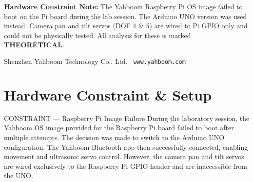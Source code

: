 \documentclass[12pt,a4paper]{article}
\begin{document}
\begin{titlepage}
  \vfill

  \begin{tcolorbox}[
    colback=DangerBG,colframe=DangerRed,
    boxrule=0.8pt,arc=4pt,
    left=10pt,right=10pt,top=6pt,bottom=6pt,
    width=0.85\linewidth
  ]
  \centering\small
  \textbf{Hardware Constraint Note:} The Yahboom Raspberry Pi OS image failed to boot on the
  Pi board during the lab session. The Arduino UNO version was used instead.
  Camera pan and tilt servos (DOF 4 \& 5) are wired to Pi GPIO only and could
  not be physically tested. All analysis for these is marked \textbf{THEORETICAL}.
  \end{tcolorbox}

  \vspace{0.5cm}
  {\small\color{MedGray} Shenzhen Yahboom Technology Co., Ltd. \textbar\
   \texttt{www.yahboom.com}}
\end{titlepage}

\tableofcontents
\newpage

\section{Hardware Constraint \& Setup}

\begin{dangerbox}{CONSTRAINT --- Raspberry Pi Image Failure}
During the laboratory session, the Yahboom OS image provided for the Raspberry Pi
board failed to boot after multiple attempts. The decision was made to switch to
the Arduino UNO configuration. The Yahboom Bluetooth app then successfully
connected, enabling movement and ultrasonic servo control. However, the camera
pan and tilt servos are wired exclusively to the Raspberry Pi GPIO header and
are inaccessible from the UNO.
\end{dangerbox}
\end{document}
